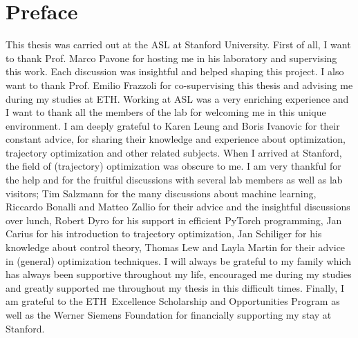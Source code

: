 \chapter*{Preface}
This thesis was carried out at the \ac{ASL} at Stanford University. First of all, I want to thank Prof. Marco Pavone for hosting me in his laboratory and supervising this work. Each discussion was insightful and helped shaping this project. I also want to thank Prof. Emilio Frazzoli for co-supervising this thesis and advising me during my studies at \ac{ETH}.
\newline
Working at \ac{ASL} was a very enriching experience and I want to thank all the members of the lab for welcoming me in this unique environment. I am deeply grateful to Karen Leung and Boris Ivanovic for their constant advice, for sharing their knowledge and experience about optimization, trajectory optimization and other related subjects.
\newline
When I arrived at Stanford, the field of (trajectory) optimization was obscure to me. I am very thankful for the help and for the fruitful discussions with several lab members as well as lab visitors; Tim Salzmann for the many discussions about machine learning, Riccardo Bonalli and Matteo Zallio for their advice and the insightful discussions over lunch, Robert Dyro for his support in efficient PyTorch programming, Jan Carius for his introduction to trajectory optimization, Jan Schiliger for his knowledge about control theory,  Thomas Lew and Layla Martin for their advice in (general) optimization techniques. I will always be grateful to my family which has always been supportive throughout my life, encouraged me during my studies and greatly supported me throughout my thesis in this difficult times. Finally, I am grateful to the \ac{ETH} Excellence Scholarship and Opportunities Program as well as the Werner Siemens Foundation for financially supporting my stay at Stanford.

\cleardoublepage